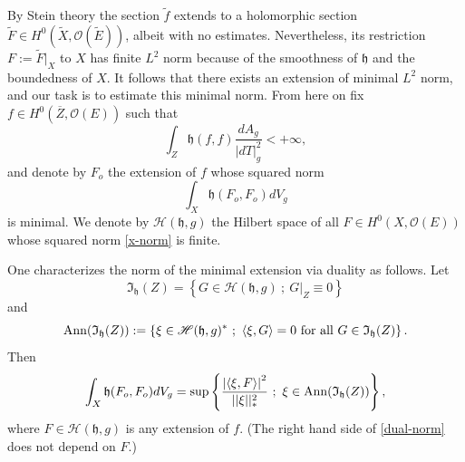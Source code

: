 \documentclass[12pt,hidelinks]{amsart}
\newcommand{\cO}{{\mathcal O}}
\newcommand{\sH}{{\mathscr H}}
\newcommand{\fI}{\mathfrak{I}}
\newcommand{\fh}{{\mathfrak h}}
\begin{document}
By Stein theory the section $\tilde f$ extends to a holomorphic section $\tilde F \in H^0(\tilde X, \cO (\tilde E))$, albeit with no estimates.  Nevertheless, its restriction $F:= \tilde F|_X$ to $X$ has finite $L^2$ norm because of the smoothness of $\fh$ and the boundedness of $X$.  It follows that there exists an extension of minimal $L^2$ norm, and our task is to estimate this minimal norm.  From here on fix $f \in H^0(\overline{Z}, \cO (E))$ such that 
\[
\int _Z \fh (f,f) \frac{dA_g}{|dT|^2_g} < +\infty,
\]
and denote by $F_o$ the extension of $f$ whose squared norm 
\begin{equation}\label{x-norm}
\int _X\fh (F_o,F_o) dV_g
\end{equation}
is minimal.  We denote by $\sH (\fh, g)$ the Hilbert space of all $F \in H^0(X, \cO (E))$ whose squared norm \eqref{x-norm} is finite.

One characterizes the norm of the minimal extension via duality as follows.  Let 
\[
\fI _{\fh}(Z) = \left \{ G \in \sH (\fh, g)\ ;\ G|_Z \equiv 0\right \}
\]
and 
\[
{\rm Ann}(\fI _{\fh}(Z)) := \left \{ \xi \in \sH (\fh, g)^* \ ;\ \left < \xi, G \right > = 0 \text{ for all }G \in \fI_{\fh}(Z) \right \}.
\]
Then 
\begin{equation}\label{dual-norm}
\int _X\fh (F_o,F_o) dV_g = \sup \left \{ \frac{\left | \left < \xi, F\right > \right |^2}{||\xi||^2_*} \ ;\ \xi \in {\rm Ann}(\fI_{\fh}(Z))\right \},
\end{equation}
where $F \in \sH (\fh, g)$ is any extension of $f$.  (The right hand side of \eqref{dual-norm} does not depend on $F$.)
\end{document}
